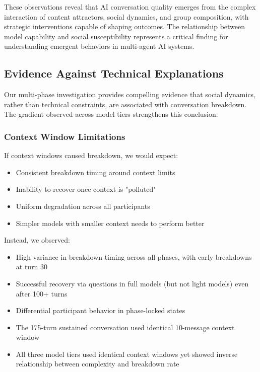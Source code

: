 \documentclass[11pt,letterpaper]{article}
\newcommand{\exponedataNegativeCase}{175}            %
\begin{document}
These observations reveal that AI conversation quality emerges from the complex interaction of content attractors, social dynamics, and group composition, with strategic interventions capable of shaping outcomes. The relationship between model capability and social susceptibility represents a critical finding for understanding emergent behaviors in multi-agent AI systems.

\subsection{Evidence Against Technical Explanations}

Our multi-phase investigation provides compelling evidence that social dynamics, rather than technical constraints, are associated with conversation breakdown. The gradient observed across model tiers strengthens this conclusion.

\subsubsection{Context Window Limitations}

If context windows caused breakdown, we would expect:
\begin{itemize}
    \item Consistent breakdown timing around context limits
    \item Inability to recover once context is "polluted"
    \item Uniform degradation across all participants
    \item Simpler models with smaller context needs to perform better
\end{itemize}

Instead, we observed:
\begin{itemize}
    \item High variance in breakdown timing across all phases, with early breakdowns at turn 30
    \item Successful recovery via questions in full models (but not light models) even after 100+ turns
    \item Differential participant behavior in phase-locked states
    \item The \exponedataNegativeCase{}-turn sustained conversation used identical 10-message context window
    \item All three model tiers used identical context windows yet showed inverse relationship between complexity and breakdown rate
\end{itemize}
\end{document}
